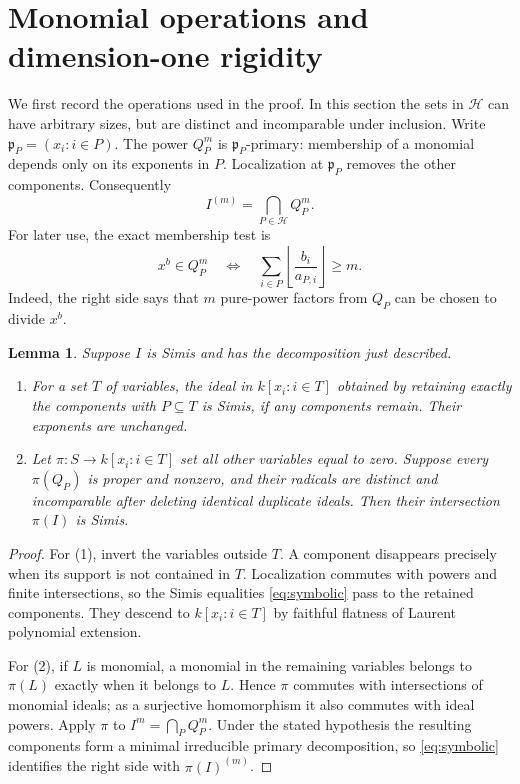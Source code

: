 \documentclass[11pt]{article}
\newtheorem{lemma}[theorem]{Lemma}
\begin{document}
\section{Monomial operations and dimension-one rigidity}
We first record the operations used in the proof. In this section the
sets in $\mathcal H$ can have arbitrary sizes, but are distinct and
incomparable under inclusion. Write $\mathfrak p_P=(x_i:i\in P)$.
The power $Q_P^m$ is $\mathfrak p_P$-primary: membership of a monomial
depends only on its exponents in $P$. Localization at
$\mathfrak p_P$ removes the other components. Consequently
\begin{equation}\label{eq:symbolic}
 I^{(m)}=\bigcap_{P\in\mathcal H}Q_P^m.
\end{equation}
For later use, the exact membership test is
\begin{equation}\label{eq:floor}
 x^b\in Q_P^m
 \quad\Longleftrightarrow\quad
 \sum_{i\in P}\left\lfloor\frac{b_i}{a_{P,i}}\right\rfloor\geq m.
\end{equation}
Indeed, the right side says that $m$ pure-power factors from $Q_P$
can be chosen to divide $x^b$.

\begin{lemma}\label{lem:operations}
Suppose $I$ is Simis and has the decomposition just described.
\begin{enumerate}
\item For a set $T$ of variables, the ideal in $k[x_i:i\in T]$
obtained by retaining exactly the components with $P\subseteq T$
is Simis, if any components remain. Their exponents are unchanged.
\item Let $\pi:S\longrightarrow k[x_i:i\in T]$ set all other
variables equal to zero. Suppose every $\pi(Q_P)$ is proper and nonzero, and their radicals
are distinct and incomparable after deleting identical duplicate
ideals. Then their intersection $\pi(I)$ is Simis.
\end{enumerate}
\end{lemma}
\begin{proof}
For (1), invert the variables outside $T$. A component disappears
precisely when its support is not contained in $T$. Localization
commutes with powers and finite intersections, so the Simis equalities
\eqref{eq:symbolic} pass to the retained components. They descend to
$k[x_i:i\in T]$ by faithful flatness of Laurent polynomial extension.

For (2), if $L$ is monomial, a monomial in the remaining variables
belongs to $\pi(L)$ exactly when it belongs to $L$. Hence $\pi$
commutes with intersections of monomial ideals; as a surjective
homomorphism it also commutes with ideal powers. Apply $\pi$ to
$I^m=\bigcap_PQ_P^m$. Under the stated hypothesis the resulting
components form a minimal irreducible primary decomposition, so
\eqref{eq:symbolic} identifies the right side with $\pi(I)^{(m)}$.
\end{proof}
\end{document}
